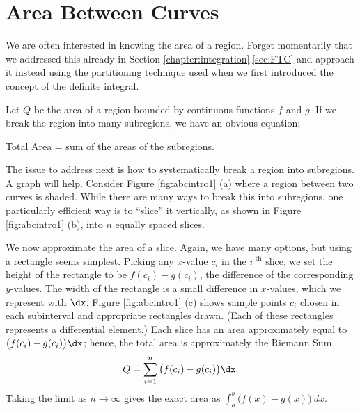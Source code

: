 \section{Area Between Curves}\label{sec:ABC1}

We are often interested in knowing the area of a region. Forget momentarily that we addressed this already in Section  \ref{chapter:integration}.\ref{sec:FTC} and approach it instead using the partitioning technique used when we first introduced the concept of the definite integral.

Let $Q$ be the area of a region bounded by continuous functions $f$ and $g$. If we break the region into many subregions, we have an obvious equation:

\hfill Total Area = sum of the areas of the subregions. \hfill \null

The issue to address next is how to systematically break a region into subregions. A graph will help. Consider Figure \ref{fig:abcintro1} (a) where a region between two curves is shaded. While there are many ways to break this into subregions, one particularly efficient way is to ``slice'' it vertically, as shown in Figure \ref{fig:abcintro1} (b), into $n$ equally spaced slices. 

We now approximate the area of a slice. Again, we have many options, but using a rectangle seems simplest. Picking any $x$-value $c_i$ in the $i^\text{ th}$ slice, we set the height of the rectangle to be $f(c_i)-g(c_i)$, the difference of the corresponding $y$-values. The width of the rectangle is a small difference in $x$-values, which we represent with $\dx$. Figure \ref{fig:abcintro1} (c) shows sample points $c_i$ chosen in each subinterval and appropriate rectangles drawn. (Each of these rectangles represents a differential element.) Each slice has an area approximately equal to $\big(f(c_i)-g(c_i)\big)\dx$; hence, the total area is approximately the Riemann Sum
$$Q = \sum_{i=1}^n \big(f(c_i)-g(c_i)\big)\dx.$$
Taking the limit as $n\to \infty$ gives the exact area as $\int_a^b \big(f(x)-g(x)\big)\ dx.$


